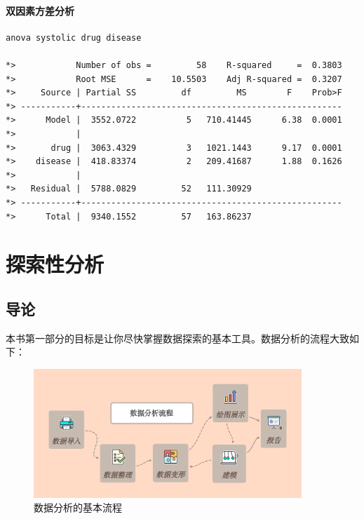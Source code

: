 \documentclass[]{ctexbook}
\begin{document}
\hypertarget{section-22}{%
\subsubsection{双因素方差分析}\label{section-22}}

\begin{lstlisting}
anova systolic drug disease

*>            Number of obs =         58    R-squared     =  0.3803
*>            Root MSE      =    10.5503    Adj R-squared =  0.3207
*>     Source | Partial SS         df         MS        F    Prob>F
*> -----------+----------------------------------------------------
*>      Model |  3552.0722          5   710.41445      6.38  0.0001
*>            |
*>       drug |  3063.4329          3   1021.1443      9.17  0.0001
*>    disease |  418.83374          2   209.41687      1.88  0.1626
*>            |
*>   Residual |  5788.0829         52   111.30929  
*> -----------+----------------------------------------------------
*>      Total |  9340.1552         57   163.86237  
\end{lstlisting}

\hypertarget{section-23}{%
\chapter{探索性分析}\label{section-23}}

\hypertarget{section-24}{%
\section{导论}\label{section-24}}

本书第一部分的目标是让你尽快掌握数据探索的基本工具。数据分析的流程大致如下：

\begin{figure}

{\centering \includegraphics[width=0.9\textwidth]{assets/数据分析流程} 

}

\caption{数据分析的基本流程}\label{fig:datawf}
\end{figure}
\end{document}

